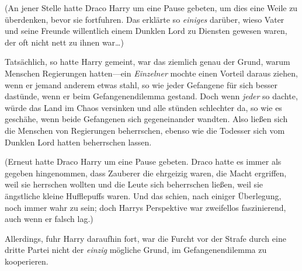 (An jener Stelle hatte Draco Harry um eine Pause gebeten, um dies eine Weile zu überdenken, bevor sie fortfuhren. Das erklärte so \emph{einiges} darüber, wieso Vater und seine Freunde willentlich einem Dunklen Lord zu Diensten gewesen waren, der oft nicht nett zu ihnen war…)

Tatsächlich, so hatte Harry gemeint, war das ziemlich genau der Grund, warum Menschen Regierungen hatten—ein \emph{Einzelner} mochte einen Vorteil daraus ziehen, wenn er jemand anderem etwas stahl, so wie jeder Gefangene für sich besser dastünde, wenn er beim Gefangenendilemma gestand. Doch wenn \emph{jeder} so dachte, würde das Land im Chaos versinken und alle stünden schlechter da, so wie es geschähe, wenn beide Gefangenen sich gegeneinander wandten. Also ließen sich die Menschen von Regierungen beherrschen, ebenso wie die Todesser sich vom Dunklen Lord hatten beherrschen lassen.

(Erneut hatte Draco Harry um eine Pause gebeten. Draco hatte es immer als gegeben hingenommen, dass Zauberer die ehrgeizig waren, die Macht ergriffen, weil sie herrschen wollten und die Leute sich beherrschen ließen, weil sie ängstliche kleine Hufflepuffs waren. Und das schien, nach einiger Überlegung, noch immer wahr zu sein; doch Harrys Perspektive war zweifellos faszinierend, auch wenn er falsch lag.)

Allerdings, fuhr Harry daraufhin fort, war die Furcht vor der Strafe durch eine dritte Partei nicht der \emph{einzig} mögliche Grund, im Gefangenendilemma zu kooperieren.

